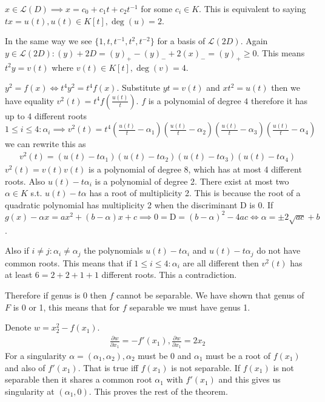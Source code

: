 \documentclass[12pt, a4paper]{article}
\begin{document}
$x \in \mathcal{L}(D) \implies x = c_0+c_1t+c_2t^{-1}$ for some $c_i \in K$. This is equivalent to saying $tx = u(t), u(t) \in K[t], \deg(u)=2$.

In the same way we see $\{1,t,t^{-1},t^2,t^{-2}\}$ for a basis of $\mathcal{L}(2D)$. Again $y \in \mathcal{L}(2D): (y) + 2D = (y)_{+} - (y)_{-} + 2(x)_{-} = (y)_{+} \geq 0$. This means $t^2y = v(t)$ where $v(t) \in K[t], \deg(v)=4$.

$y^2 = f(x) \iff t^4y^2=t^4f(x)$. Substitute $yt=v(t)$ and $xt^2=u(t)$ then we have equality $v^2(t)=t^4f(\frac{u(t)}{t})$. $f$ is a polynomial of degree $4$ therefore it has up to $4$ different roots $1 \leq i \leq 4: \alpha_i \implies v^2(t)=t^4(\frac{u(t)}{t}-\alpha_1)(\frac{u(t)}{t}-\alpha_2)(\frac{u(t)}{t}-\alpha_3)(\frac{u(t)}{t}-\alpha_4)$ we can rewrite this as 
\begin{gather*}
v^2(t)=(u(t)-t\alpha_1)(u(t)-t\alpha_2)(u(t)-t\alpha_3)(u(t)-t\alpha_4)
\end{gather*}
$v^2(t)=v(t)v(t)$ is a polynomial of degree $8$, which has at most 4 different roots. Also $u(t)-t\alpha_i$ is a polynomial of degree 2. There exist at most two $\alpha \in K$ s.t. $u(t)-t\alpha$ has a root of multiplicity 2. This is because the root of a quadratic polynomial has multiplicity 2 when the discriminant D is 0. If $g(x)-\alpha x=ax^2+(b-\alpha)x+c \implies 0 = \text{D} = (b-\alpha)^2-4ac \iff \alpha = \pm 2\sqrt{ac}+b$.

Also if $i\neq j: \alpha_i \neq \alpha_j$ the polynomials $u(t)-t\alpha_i$ and $u(t)-t\alpha_j$ do not have common roots. This means that if $1 \leq i \leq 4: \alpha_i$ are all different then $v^2(t)$ has at least $6 = 2+2+1+1$ different roots. This a contradiction.

Therefore if genus is $0$ then $f$ cannot be separable. We have shown that genus of $F$ is 0 or 1, this means that for $f$ separable we must have genus 1.

Denote $w=x_2^2-f(x_1)$.
\begin{gather}
\frac{\partial w}{\partial x_1} = -f'(x_1), \frac{\partial w}{\partial x_1} = 2x_2
\end{gather}
For a singularity $\alpha = (\alpha_1, \alpha_2), \alpha_2$ must be $0$ and $\alpha_1$ must be a root of $f(x_1)$ and also of $f'(x_1)$. That is true iff $f(x_1)$ is not separable. If $f(x_1)$ is not separable then it shares a common root $\alpha_1$ with $f'(x_1)$ and this gives us singularity at $(\alpha_1, 0)$. This proves the rest of the theorem.
\end{document}
